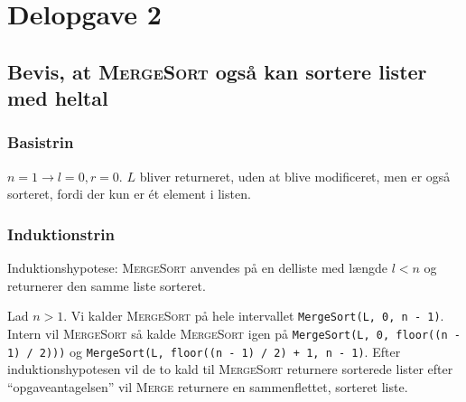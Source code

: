 \section{Delopgave 2}\label{sec:delopgave-23}

\subsection{Bevis, at \textsc{MergeSort} også kan sortere lister med heltal}
\label{subsec:bevis-at-mergesort-ogsa-kan-sortere-lister-med-heltal}

\subsubsection{Basistrin}

\(n = 1 \rightarrow l = 0, r = 0\).
\(L\) bliver returneret, uden at blive modificeret, men er også sorteret, fordi der kun er ét element i listen.

\subsubsection{Induktionstrin}

Induktionshypotese: \textsc{MergeSort} anvendes på en delliste med længde \(l < n\) og returnerer den samme liste
sorteret.

Lad \(n > 1\).
Vi kalder \textsc{MergeSort} på hele intervallet \lstinline{MergeSort(L, 0, n - 1)}.
Intern vil \textsc{MergeSort} så kalde \textsc{MergeSort} igen på \lstinline{MergeSort(L, 0, floor((n - 1) / 2)))} og
\lstinline{MergeSort(L, floor((n - 1) / 2) + 1, n - 1)}.
Efter induktionshypotesen vil de to kald til \textsc{MergeSort} returnere sorterede lister efter ``opgaveantagelsen''
vil \textsc{Merge} returnere en sammenflettet, sorteret liste.
